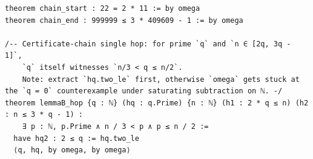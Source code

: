 \documentclass[11pt]{article}
\theoremstyle{definition}
\begin{document}
\begin{lstlisting}[basicstyle=\ttfamily\footnotesize,caption={Excerpt of the
proof file (lines 96--168 of \texttt{final-nfact-primorial-square.lean},
which ships in full in \texttt{proofs/}): the certificate-chain mechanism for
Lemma~\ref{lem:B} on $22 \le n \le 999999$ --- the two boundary certificates,
the single-hop lemma \texttt{lemmaB\_hop}, and the twenty-nine-hop decision
tree.},label={lst:chain}]
theorem chain_start : 22 = 2 * 11 := by omega
theorem chain_end : 999999 ≤ 3 * 409609 - 1 := by omega

/-- Certificate-chain single hop: for prime `q` and `n ∈ [2q, 3q - 1]`,
    `q` itself witnesses `n/3 < q ≤ n/2`.
    Note: extract `hq.two_le` first, otherwise `omega` gets stuck at the `q = 0` counterexample under saturating subtraction on ℕ. -/
theorem lemmaB_hop {q : ℕ} (hq : q.Prime) {n : ℕ} (h1 : 2 * q ≤ n) (h2 : n ≤ 3 * q - 1) :
    ∃ p : ℕ, p.Prime ∧ n / 3 < p ∧ p ≤ n / 2 :=
  have hq2 : 2 ≤ q := hq.two_le
  ⟨q, hq, by omega, by omega⟩


\end{lstlisting}
\end{document}
